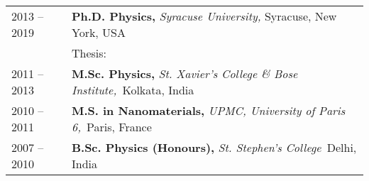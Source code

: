 


\begin{longtable}{R{2.5cm}|p{14.8cm}}
 	\textsc{2013 -- 2019} &\textbf{Ph.D. Physics, } \emph{Syracuse University,} Syracuse, New York, USA\\ 
& Thesis:  \\ %
	\textsc{2011 -- 2013} & \textbf{M.Sc. Physics, }\emph{St. Xavier's College \& Bose Institute,}{~Kolkata, }{India} \\
\textsc{2010 -- 2011} &\textbf{M.S. in Nanomaterials, }\emph{UPMC, University of Paris 6,}{~Paris, }{France} \\
\textsc{2007 -- 2010} & \textbf{B.Sc. Physics (Honours),} \emph{St. Stephen's College}{~Delhi, }{India} \\	
\end{longtable}

